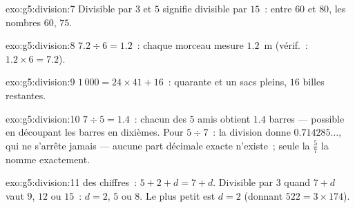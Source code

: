 \begin{solution}{exo:g5:division:7}
Divisible par $3$ et $5$ signifie divisible par $15$~: entre $60$
et $80$, les nombres $60$, $75$.
\end{solution}

\begin{solution}{exo:g5:division:8}
$7.2 \div 6 = 1.2$~: chaque morceau mesure $1.2$~m (vérif.~:
$1.2 \times 6 = 7.2$).
\end{solution}

\begin{solution}{exo:g5:division:9}
$1\,000 = 24 \times 41 + 16$~: quarante et un sacs pleins, $16$
billes restantes.
\end{solution}

\begin{solution}{exo:g5:division:10}
$7 \div 5 = 1.4$~: chacun des $5$ amis obtient $1.4$ barres ---
possible en découpant les barres en dixièmes. Pour $5 \div 7$~: la
division donne $0.714285\dots$, qui ne s'arrête jamais --- aucune
part décimale exacte n'existe~; seule la  $\frac57$ la
nomme exactement.
\end{solution}

\begin{solution}{exo:g5:division:11}
 des chiffres~: $5 + 2 + d = 7 + d$. Divisible par $3$ quand
$7 + d$ vaut $9$, $12$ ou $15$~: $d = 2$, $5$ ou $8$. Le plus
petit est $d = 2$ (donnant $522 = 3 \times 174$).
\end{solution}
